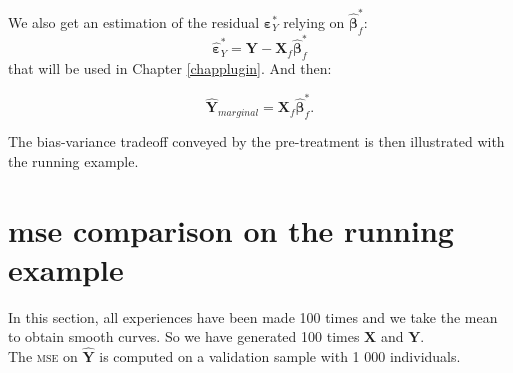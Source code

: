 \documentclass[12pt,a4paper]{report}
\begin{document}
 			We also get an estimation of the residual  $\boldsymbol{\varepsilon}_Y^*$ relying on $\hat{\boldsymbol{\beta}}^*_f$:
	\begin{equation}
		\hat{\boldsymbol{\varepsilon}}_Y^*=\boldsymbol{Y}-\boldsymbol{X}_f\hat{\boldsymbol{\beta}}^*_f \label{estimepsYstar}
	\end{equation}	
	that will be used in Chapter \ref{chapplugin}. And then:
		
	\begin{equation}
	\hat{\boldsymbol{Y}}_{marginal}=\boldsymbol{X}_f\hat{\boldsymbol{\beta}}_f^*.%
	\end{equation}
	  
	The bias-variance tradeoff conveyed by the pre-treatment is then illustrated with the running example.
	\section{{\sc mse} comparison on the running example}\label{MSEvraiS}
In this section, all experiences have been made 100 times and we take the mean to obtain smooth curves. So we have generated 100 times $\boldsymbol{X}$ and $\boldsymbol{Y}$.\\	
	The \textsc{mse} on $\hat{\boldsymbol{Y}}$ is computed on a validation sample with 1 000 individuals.\\
%
\end{document}
